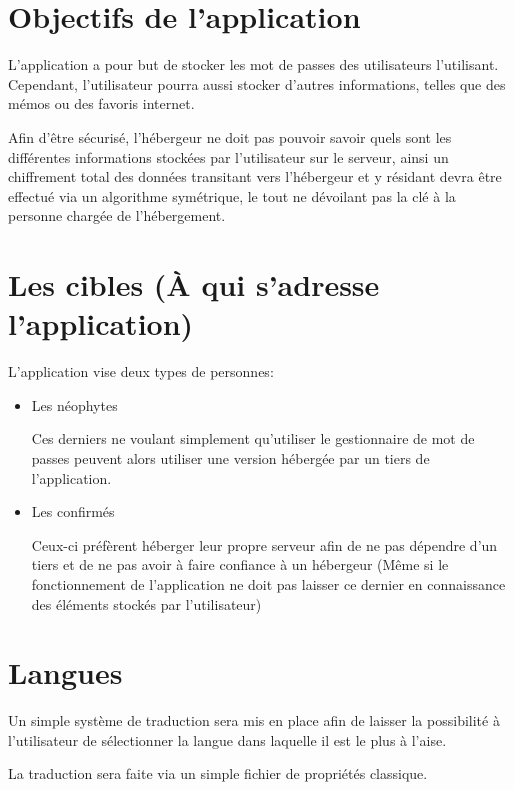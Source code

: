 \documentclass[oneside]{report}
\begin{document}
	\section{Objectifs de l'application}
	{
		\par L'application a pour but de stocker les mot de passes des utilisateurs l'utilisant. Cependant, l'utilisateur pourra aussi stocker d'autres informations, telles que des mémos ou des favoris internet.
		\vspace{.5cm}
		\par Afin d'être sécurisé, l'hébergeur ne doit pas pouvoir savoir quels sont les différentes informations stockées par l'utilisateur sur le serveur, ainsi un chiffrement total des données transitant vers l'hébergeur et y résidant devra être effectué via un algorithme symétrique, le tout ne dévoilant pas la clé à la personne chargée de l'hébergement.
	}

	\section{Les cibles (À qui s'adresse l'application)}
	{
		\par L'application vise deux types de personnes:
		\begin{itemize}
			\item Les néophytes \par Ces derniers ne voulant simplement qu'utiliser le gestionnaire de mot de passes peuvent alors utiliser une version hébergée par un tiers de l'application.
			\item Les confirmés \par Ceux-ci préfèrent héberger leur propre serveur afin de ne pas dépendre d'un tiers et de ne pas avoir à faire confiance à un hébergeur (Même si le fonctionnement de l'application ne doit pas laisser ce dernier en connaissance des éléments stockés par l'utilisateur)
		\end{itemize}
	}

	\section{Langues}
	{
		\par Un simple système de traduction sera mis en place afin de laisser la possibilité à l'utilisateur de sélectionner la langue dans laquelle il est le plus à l'aise.
		\par La traduction sera faite via un simple fichier de propriétés classique.
	}
\end{document}

